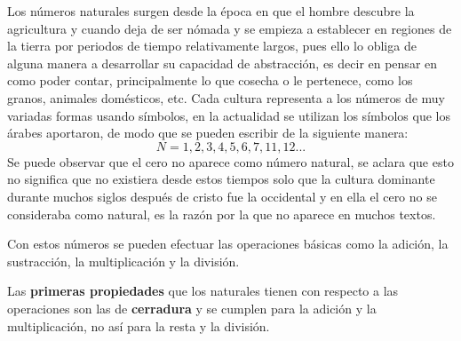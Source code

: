 \documentclass{article}
\begin{document}
Los números naturales surgen desde la época en que  el hombre descubre la agricultura y cuando deja de ser nómada y se   empieza a establecer en regiones de la tierra por periodos de tiempo relativamente largos, pues ello lo obliga de alguna manera a desarrollar su capacidad de abstracción, es decir en pensar en como poder contar, principalmente lo que cosecha o le pertenece, como los granos, animales domésticos, etc. Cada cultura representa a los números de muy variadas formas usando símbolos, en la actualidad se utilizan los símbolos que los árabes aportaron, de modo que se pueden escribir de la siguiente manera: 
\[N=1,2,3,4,5,6,7,11,12...\]
Se puede observar que el cero no aparece como número natural, se aclara que esto no significa que no existiera desde estos tiempos solo que la cultura dominante durante muchos siglos después de cristo fue la occidental y en ella el cero no se consideraba como natural, es la razón por la que no aparece en muchos textos.

Con estos números se pueden efectuar las operaciones básicas como la adición, la sustracción, la multiplicación y la división.

Las \textbf{primeras propiedades}  que los naturales tienen con respecto a las operaciones son las de \textbf{cerradura} y se cumplen para la adición y la multiplicación, no así para la resta y la división.
\end{document}
